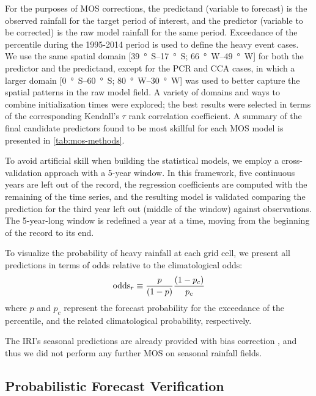 \documentclass{ametsoc}
\begin{document}
For the purposes of MOS corrections, the predictand (variable to forecast) is the observed rainfall for the target period of interest, and the predictor (variable to be corrected) is the raw model rainfall for the same period.
Exceedance of the  percentile during the 1995-2014 period is used to define the heavy event cases.
We use the same spatial domain [\SIrange{39}{17}{\degree S}; \SIrange{66}{49}{\degree W}] for both the predictor and the predictand, except for the PCR and CCA cases, in which a larger domain [\SIrange{0}{60}{\degree S}; \SIrange{80}{30}{\degree W}] was used to better capture the spatial patterns in the raw model field.
A variety of domains and ways to combine initialization times were explored; the best results were selected in terms of the corresponding Kendall's $\tau$ rank correlation coefficient.
A summary of the final candidate predictors found to be most skillful for each MOS model is presented in \cref{tab:mos-methods}.

To avoid artificial skill when building the statistical models, we employ a cross-validation approach with a 5-year window.
In this framework, five continuous years are left out of the record, the regression coefficients are computed with the remaining of the time series, and the resulting model is validated comparing the prediction for the third year left out (middle of the window) against observations.
The 5-year-long window is redefined a year at a time, moving from the beginning of the record to its end.

To visualize the probability of heavy rainfall at each grid cell, we present all predictions in terms of odds relative to the climatological odds:
\begin{equation} \label{eq:odds-ratio}
	\text{odds}_{r} \equiv \frac{p}{\qty(1 - p)} \frac{\qty(1 - p_c)}{p_c}
\end{equation}
where $p$ and $p_c$ represent the forecast probability for the exceedance of the  percentile, and the related climatological probability, respectively.

The IRI's seasonal predictions are already provided with bias correction \citep{Barnston:2010ge}, and thus we did not perform any further MOS on seasonal rainfall fields.

\subsection{Probabilistic Forecast Verification}
\end{document}
